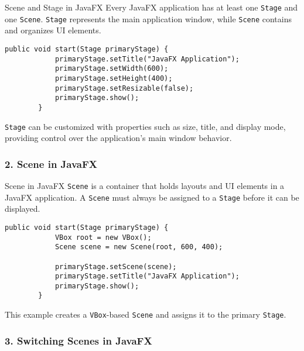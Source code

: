 \documentclass[aspectratio=169, table]{beamer}
\begin{document}
\begin{frame}[fragile]{Scene and Stage in JavaFX}
	\vspace{20pt}
	Every JavaFX application has at least one \texttt{Stage} and one \texttt{Scene}.  
	\texttt{Stage} represents the main application window, while \texttt{Scene} contains and organizes UI elements.

	\begin{lstlisting}[style=JavaStyle]
		public void start(Stage primaryStage) {
			primaryStage.setTitle("JavaFX Application");
			primaryStage.setWidth(600);
			primaryStage.setHeight(400);
			primaryStage.setResizable(false);
			primaryStage.show();
		}
	\end{lstlisting}
	
	\texttt{Stage} can be customized with properties such as size, title, and display mode,  
	providing control over the application's main window behavior.
\end{frame}


\subsubsection{2. Scene in JavaFX}

\begin{frame}[fragile]{Scene in JavaFX}
	\vspace{20pt}
	\texttt{Scene} is a container that holds layouts and UI elements in a JavaFX application.  
	A \texttt{Scene} must always be assigned to a \texttt{Stage} before it can be displayed.
	
	\begin{lstlisting}[style=JavaStyle]
		public void start(Stage primaryStage) {
			VBox root = new VBox();
			Scene scene = new Scene(root, 600, 400);
			
			primaryStage.setScene(scene);
			primaryStage.setTitle("JavaFX Application");
			primaryStage.show();
		}
	\end{lstlisting}
	
	This example creates a \texttt{VBox}-based \texttt{Scene} and assigns it to the primary \texttt{Stage}.
\end{frame}


\subsubsection{3. Switching Scenes in JavaFX}
\end{document}
